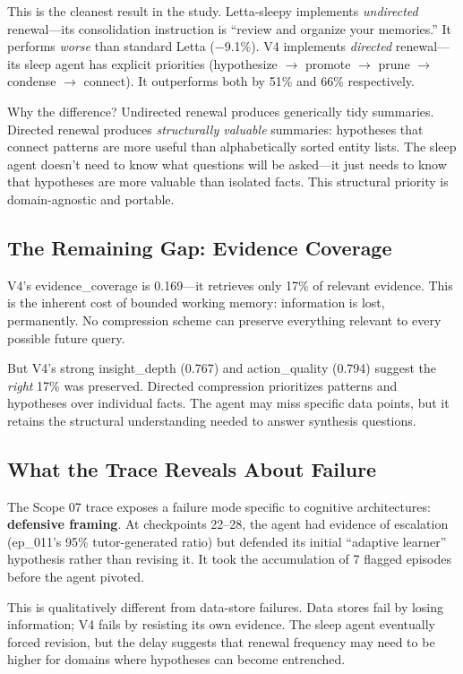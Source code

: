 \documentclass[11pt,letterpaper]{article}
\begin{document}
This is the cleanest result in the study. Letta-sleepy implements \emph{undirected} renewal---its consolidation instruction is ``review and organize your memories.'' It performs \emph{worse} than standard Letta ($-$9.1\%). V4 implements \emph{directed} renewal---its sleep agent has explicit priorities (hypothesize $\to$ promote $\to$ prune $\to$ condense $\to$ connect). It outperforms both by 51\% and 66\% respectively.

Why the difference? Undirected renewal produces generically tidy summaries. Directed renewal produces \emph{structurally valuable} summaries: hypotheses that connect patterns are more useful than alphabetically sorted entity lists. The sleep agent doesn't need to know what questions will be asked---it just needs to know that hypotheses are more valuable than isolated facts. This structural priority is domain-agnostic and portable.

\subsection{The Remaining Gap: Evidence Coverage}

V4's evidence\_coverage is 0.169---it retrieves only 17\% of relevant evidence. This is the inherent cost of bounded working memory: information is lost, permanently. No compression scheme can preserve everything relevant to every possible future query.

But V4's strong insight\_depth (0.767) and action\_quality (0.794) suggest the \emph{right} 17\% was preserved. Directed compression prioritizes patterns and hypotheses over individual facts. The agent may miss specific data points, but it retains the structural understanding needed to answer synthesis questions.

\subsection{What the Trace Reveals About Failure}

The Scope 07 trace exposes a failure mode specific to cognitive architectures: \textbf{defensive framing}. At checkpoints 22--28, the agent had evidence of escalation (ep\_011's 95\% tutor-generated ratio) but defended its initial ``adaptive learner'' hypothesis rather than revising it. It took the accumulation of 7 flagged episodes before the agent pivoted.

This is qualitatively different from data-store failures. Data stores fail by losing information; V4 fails by resisting its own evidence. The sleep agent eventually forced revision, but the delay suggests that renewal frequency may need to be higher for domains where hypotheses can become entrenched.
\end{document}
